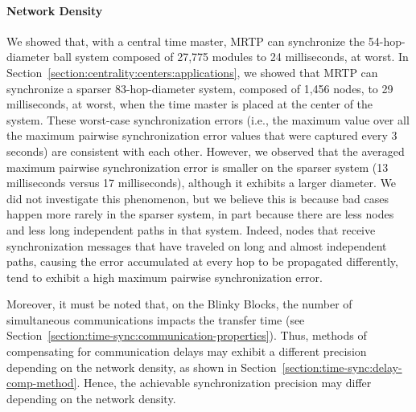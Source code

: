 \paragraph{Network Density}
We showed that, with a central time master, MRTP can synchronize the 54-hop-diameter ball system composed of 27,775 modules to 24 milliseconds, at worst. In Section~\ref{section:centrality:centers:applications}, we showed that MRTP can synchronize a sparser 83-hop-diameter system, composed of 1,456 nodes, to 29 milliseconds, at worst, when the time master is placed at the center of the system. These worst-case synchronization errors (i.e., the maximum value over all the maximum pairwise synchronization error values that were captured every 3 seconds) are consistent with each other. However, we observed that the averaged maximum pairwise synchronization error is smaller on the sparser system (13 milliseconds versus 17 milliseconds), although it exhibits a larger diameter. We did not investigate this phenomenon, but we believe this is because bad cases happen more rarely in the sparser system, in part because there are less nodes and less long independent paths in that system. Indeed, nodes that receive synchronization messages that have traveled on long and almost independent paths, causing the error accumulated at every hop to be propagated differently, tend to exhibit a high maximum pairwise synchronization error. 

Moreover, it must be noted that, on the Blinky Blocks, the number of simultaneous communications impacts the transfer time (see Section~\ref{section:time-sync:communication-properties}). Thus,   methods of compensating for communication delays may exhibit a different precision depending on the network density, as shown in Section~\ref{section:time-sync:delay-comp-method}. Hence, the achievable synchronization precision may differ depending on the network density.

